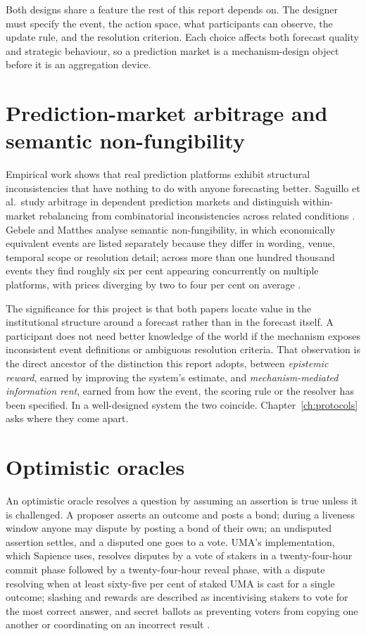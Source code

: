 Both designs share a feature the rest of this report depends on. The designer must specify
the event, the action space, what participants can observe, the update rule, and the
resolution criterion. Each choice affects both forecast quality and strategic behaviour, so
a prediction market is a mechanism-design object before it is an aggregation device.

\section{Prediction-market arbitrage and semantic non-fungibility}
\label{sec:bg-arb}

Empirical work shows that real prediction platforms exhibit structural inconsistencies that
have nothing to do with anyone forecasting better. Saguillo et al.\ study arbitrage in
dependent prediction markets and distinguish within-market rebalancing from combinatorial
inconsistencies across related conditions \cite{saguillo2025forest}. Gebele and Matthes
analyse semantic non-fungibility, in which economically equivalent events are listed
separately because they differ in wording, venue, temporal scope or resolution detail;
across more than one hundred thousand events they find roughly six per cent appearing
concurrently on multiple platforms, with prices diverging by two to four per cent on average
\cite{gebele2026semantic}.

The significance for this project is that both papers locate value in the institutional
structure around a forecast rather than in the forecast itself. A participant does not need
better knowledge of the world if the mechanism exposes inconsistent event definitions or
ambiguous resolution criteria. That observation is the direct ancestor of the distinction
this report adopts, between \emph{epistemic reward}, earned by improving the
system's estimate, and \emph{mechanism-mediated information rent}, earned from how the event,
the scoring rule or the resolver has been specified. In a well-designed system the two
coincide. Chapter~\ref{ch:protocols} asks where they come apart.

\section{Optimistic oracles}
\label{sec:bg-oracles}

An optimistic oracle resolves a question by assuming an assertion is true unless it is
challenged. A proposer asserts an outcome and posts a bond; during a liveness window anyone
may dispute by posting a bond of their own; an undisputed assertion settles, and a disputed
one goes to a vote. UMA's implementation, which Sapience uses, resolves disputes by a vote of
stakers in a twenty-four-hour commit phase followed by a twenty-four-hour reveal phase, with
a dispute resolving when at least sixty-five per cent of staked UMA is cast for a single
outcome; slashing and rewards are described as incentivising stakers to vote for the most
correct answer, and secret ballots as preventing voters from copying one another or
coordinating on an incorrect result \cite{uma2026oracle}.


